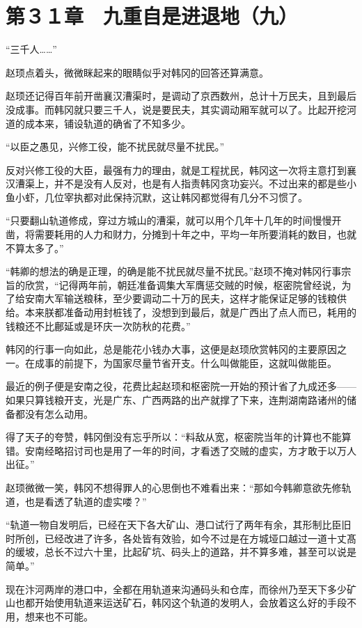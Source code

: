 \section{第３１章　九重自是进退地（九）}

“三千人……”

赵顼点着头，微微眯起来的眼睛似乎对韩冈的回答还算满意。

赵顼还记得百年前开凿襄汉漕渠时，是调动了京西数州，总计十万民夫，且到最后没成事。而韩冈就只要三千人，说是要民夫，其实调动厢军就可以了。比起开挖河道的成本来，铺设轨道的确省了不知多少。

“以臣之愚见，兴修工役，能不扰民就尽量不扰民。”

反对兴修工役的大臣，最强有力的理由，就是工程扰民，韩冈这一次将主意打到襄汉漕渠上，并不是没有人反对，也是有人指责韩冈贪功妄兴。不过出来的都是些小鱼小虾，几位宰执都对此保持沉默，这让韩冈都觉得有几分不习惯了。

“只要翻山轨道修成，穿过方城山的漕渠，就可以用个几年十几年的时间慢慢开凿，将需要耗用的人力和财力，分摊到十年之中，平均一年所要消耗的数目，也就不算太多了。”

“韩卿的想法的确是正理，的确是能不扰民就尽量不扰民。”赵顼不掩对韩冈行事宗旨的欣赏，“记得两年前，朝廷准备调集大军膺惩交贼的时候，枢密院曾经说，为了给安南大军输送粮秣，至少要调动二十万的民夫，这样才能保证足够的钱粮供给。本来朕都准备动用封桩钱了，没想到到最后，就是广西出了点人而已，耗用的钱粮还不比鄜延或是环庆一次防秋的花费。”

韩冈的行事一向如此，总是能花小钱办大事，这便是赵顼欣赏韩冈的主要原因之一。在成事的前提下，为国家尽量节省开支。什么叫做能臣，这就叫做能臣。

最近的例子便是安南之役，花费比起赵顼和枢密院一开始的预计省了九成还多——如果只算钱粮开支，光是广东、广西两路的出产就撑了下来，连荆湖南路诸州的储备都没有怎么动用。

得了天子的夸赞，韩冈倒没有忘乎所以：“料敌从宽，枢密院当年的计算也不能算错。安南经略招讨司也是用了一年的时间，才看透了交贼的虚实，方才敢于以万人出征。”

赵顼微微一笑，韩冈不想得罪人的心思倒也不难看出来：“那如今韩卿意欲先修轨道，也是看透了轨道的虚实喽？”

“轨道一物自发明后，已经在天下各大矿山、港口试行了两年有余，其形制比臣旧时所创，已经改进了许多，各处皆有效验，如今不过是在方城垭口越过一道十丈髙的缓坡，总长不过六十里，比起矿坑、码头上的道路，并不算多难，甚至可以说是简单。”

现在汴河两岸的港口中，全都在用轨道来沟通码头和仓库，而徐州乃至天下多少矿山也都开始使用轨道来运送矿石，韩冈这个轨道的发明人，会放着这么好的手段不用，想来也不可能。

